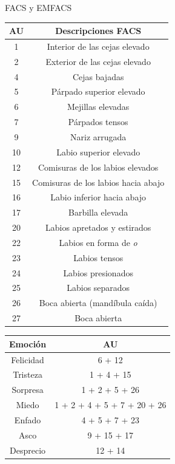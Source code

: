 \documentclass{beamer}
\begin{document}
\begin{frame}{FACS y EMFACS}
\begin{table}[h!]
\begin{minipage}{0.45\linewidth}
\centering
\begin{adjustbox}{max width=\textwidth}
\begin{tabular}{|c|c|}
     \hline
    \textbf{AU} & \textbf{Descripciones FACS} \\
    \hline
     1 & Interior de las cejas elevado\\ 
     2 & Exterior de las cejas elevado \\ 
     4 & Cejas bajadas \\
     5 & Párpado superior elevado\\
     6 & Mejillas elevadas \\ 
     7 & Párpados tensos \\
     9 & Nariz arrugada \\
     10 & Labio superior elevado \\
     12 & Comisuras de los labios elevados \\ 
     15 & Comisuras de los labios hacia abajo \\
     16 & Labio inferior hacia abajo \\
     17 & Barbilla elevada \\
     20 & Labios apretados y estirados\\
     22 & Labios en forma de \textit{o} \\
     23 & Labios tensos \\
     24 & Labios presionados \\
     25 & Labios separados \\
     26 & Boca abierta (mandíbula caída)\\
     27 & Boca abierta \\
     \hline
 \end{tabular}
\end{adjustbox}
\end{minipage} \hspace{0.1cm}
\begin{minipage}{0.45\linewidth}
\centering
\begin{adjustbox}{max width=\textwidth}
\begin{tabular}{|c|c|}
     \hline
    \textbf{Emoción} & \textbf{AU} \\
    \hline
     Felicidad & 6 + 12\\ 
     Tristeza & 1 + 4 + 15 \\ 
     Sorpresa & 1 + 2 + 5 + 26 \\
     Miedo & 1 + 2 + 4 + 5 + 7 + 20 + 26\\
     Enfado & 4 + 5 + 7 + 23 \\ 
     Asco & 9 + 15 + 17 \\
     Desprecio & 12 + 14 \\
     \hline
 \end{tabular}
\end{adjustbox}
\end{minipage}
\end{table}
\end{frame}
\end{document}
